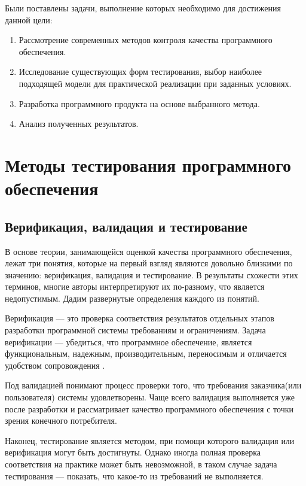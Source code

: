 \documentclass[a4paper,14pt,href]{article}
\begin{document}
  Были поставлены задачи, выполнение которых необходимо для достижения данной цели:
\begin{enumerate}
\item Рассмотрение современных методов контроля качества программного обеспечения. 
\item Исследование существующих форм тестирования, выбор наиболее подходящей модели для практической реализации при заданных условиях.
\item Разработка программного продукта на основе выбранного метода.
\item Анализ полученных результатов.
\end{enumerate}  

\section{Методы тестирования программного обеспечения}
\subsection{Верификация, валидация и тестирование}
 В основе теории, занимающейся оценкой качества программного обеспечения, лежат три понятия, которые на первый взгляд являются довольно близкими по значению: верификация, валидация и тестирование. В результаты схожести этих терминов, многие авторы интерпретируют их по-разному\cite{IntelVerification}, что является недопустимым. Дадим развернутые определения каждого из понятий.
 
 Верификация --- это проверка соответствия результатов отдельных этапов разработки программной системы требованиям и ограничениям. Задача верификации --- убедиться, что программное обеспечение, является функциональным, надежным, производительным, переносимым и отличается удобством сопровождения\cite{Kulyamin} \cite{ISO9126}. 
 
 Под валидацией понимают процесс проверки того, что требования заказчика(или пользователя) системы удовлетворены. Чаще всего валидация выполняется уже после разработки и рассматривает качество программного обеспечения с точки зрения конечного потребителя.
 
 Наконец, тестирование является методом, при помощи которого валидация или верификация могут быть достигнуты. Однако иногда полная проверка соответствия на практике может быть невозможной, в таком случае задача тестирования --- показать, что какое-то из требований не выполняется\cite{Ahin}.
 
\end{document}
